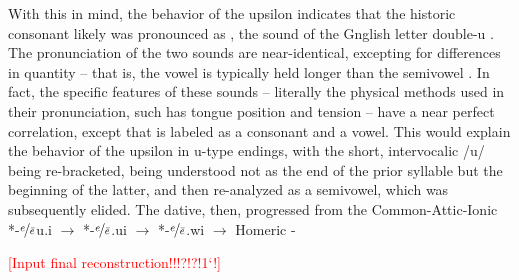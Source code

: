 With this in mind, the behavior of the upsilon  indicates
that the historic consonant likely was pronounced as ,
the sound of the Gnglish letter double-u . 
The pronunciation of the two sounds are near-identical, excepting
for differences in quantity -- that is, the vowel  is typically
held longer than the semivowel . In fact, the specific features
of these sounds -- literally the physical methods used in their pronunciation,
such has tongue position and tension -- have a near perfect correlation,
except that  is labeled as a consonant and  a vowel.
This would explain the behavior of the upsilon  in u-type
endings, with the short, intervocalic /u/ being re-bracketed, being
understood not as the end of the prior syllable but the beginning of the
latter, and then re-analyzed as a semivowel, which was subsequently elided.
The dative, then, progressed from the Common-Attic-Ionic
*-$\nicefrac{e}{\bar{e}}$u.i $\to$ *-$\nicefrac{e}{\bar{e}}$.ui $\to$
*-$\nicefrac{e}{\bar{e}}$.wi $\to$ Homeric
-

\textcolor{red}{[Input final reconstruction!!!?!?!1`!]}